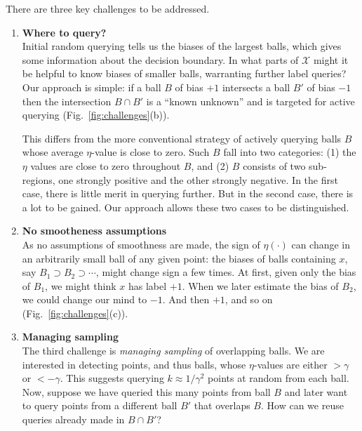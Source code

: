 \documentclass[twoside]{article}
\def\X{{\mathcal X}}
\def\B{{\mathcal B}}
\begin{document}
There are three key challenges to be addressed. 

\begin{enumerate}
\item \label{challange:wheretoquery}
  {\bf Where to query?} \\
  Initial random querying tells us the biases of the largest balls,
  which gives some information about the decision boundary. In what
  parts of $\X$ might it be helpful to know biases of smaller balls,
  warranting further label queries? Our approach is simple: if a ball
  $B$ of bias $+1$ intersects a ball $B'$ of bias $-1$ then the
  intersection $B \cap B'$ is a ``known unknown'' and is targeted for
  active querying (Fig.~\ref{fig:challenges}(b)).

  This differs from the more conventional strategy of actively
  querying balls $B$ whose average $\eta$-value is close to zero. Such
  $B$ fall into two categories: (1) the $\eta$ values are close to
  zero throughout $B$, and (2) $B$ consists of two sub-regions, one
  strongly positive and the other strongly negative. In the first
  case, there is little merit in querying further. But in the second
  case, there is a lot to be gained. Our approach allows these two
  cases to be distinguished.


\item \label{challange:nosmoothness}
  {\bf No smootheness assumptions}\\
  As no assumptions of smoothness are made, the sign of $\eta(\cdot)$
  can change in an arbitrarily small ball of any given point: the
  biases of balls containing $x$, say
  $B_1 \supset B_2 \supset \cdots$, might change sign a few times. At
  first, given only the bias of $B_1$, we might think $x$ has label
  $+1$. When we later estimate the bias of $B_2$, we could change our
  mind to $-1$. And then $+1$, and so on
  (Fig.~\ref{fig:challenges}(c)).


\item \label{challange:managingsampling}
  {\bf Managing sampling} \\
  The third challenge is \emph{managing sampling} of overlapping
  balls. We are interested in detecting points, and thus balls, whose
  $\eta$-values are either $> \gamma$ or $<-\gamma$. This suggests
  querying $k \approx 1/\gamma^2$ points at random from each
  ball. Now, suppose we have queried this many points from ball $B$
  and later want to query points from a different ball $B'$ that
  overlaps $B$. How can we reuse queries already made in $B \cap B'$?

\end{enumerate}
\end{document}
